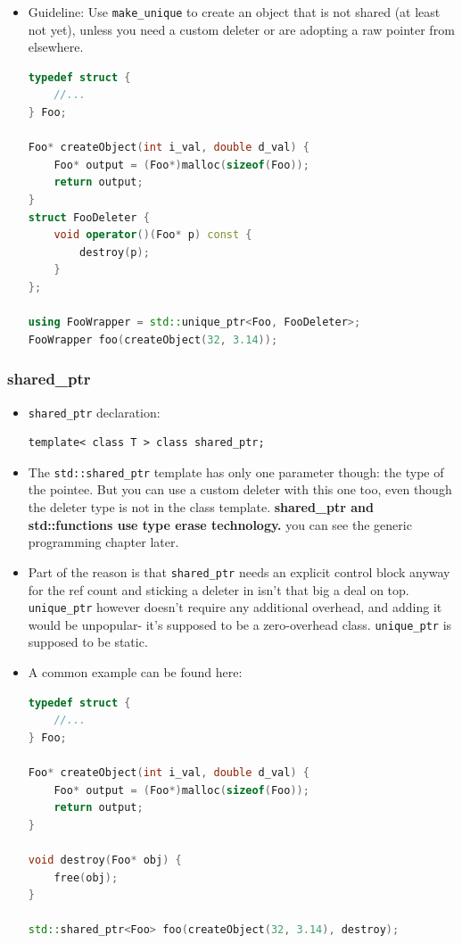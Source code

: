 \documentclass[a4paper,11pt,twoside]{book}
\begin{document}
\begin{itemize}
	\item Guideline: Use \texttt{make\_unique} to create an object that is not shared (at least not yet), unless you need a custom deleter or are adopting a raw pointer from elsewhere.
	
\begin{lstlisting}[frame=single, language=c++]
typedef struct {
	//...
} Foo;

Foo* createObject(int i_val, double d_val) {
	Foo* output = (Foo*)malloc(sizeof(Foo));
	return output;
}
struct FooDeleter {
	void operator()(Foo* p) const {
		destroy(p);
	}
};
	
using FooWrapper = std::unique_ptr<Foo, FooDeleter>;
FooWrapper foo(createObject(32, 3.14));
\end{lstlisting}


\end{itemize}

\subsubsection{shared\_ptr}
\begin{itemize}
	\item \texttt{shared\_ptr} declaration:
\begin{lstlisting}
template< class T > class shared_ptr;
\end{lstlisting}
	\item The \texttt{std::shared\_ptr} template has only one parameter though: the type of the pointee. But you can use a custom deleter with this one too, even though the deleter type is not in the class template. \textbf{shared\_ptr and std::functions use type erase technology.} you can see the generic programming chapter later.
	
	\item Part of the reason is that \texttt{shared\_ptr} needs an explicit control block anyway for the ref count and sticking a deleter in isn't that big a deal on top. \texttt{unique\_ptr} however doesn't require any additional overhead, and adding it would be unpopular- it's supposed to be a zero-overhead class. \texttt{unique\_ptr} is supposed to be static.
	
	\item A common example can be found here:
\begin{lstlisting}[frame=single, language=c++]
typedef struct {
	//...
} Foo;

Foo* createObject(int i_val, double d_val) {
	Foo* output = (Foo*)malloc(sizeof(Foo));
	return output;
}

void destroy(Foo* obj) {
	free(obj);
}

std::shared_ptr<Foo> foo(createObject(32, 3.14), destroy);
\end{lstlisting}
\end{itemize}
\end{document}
